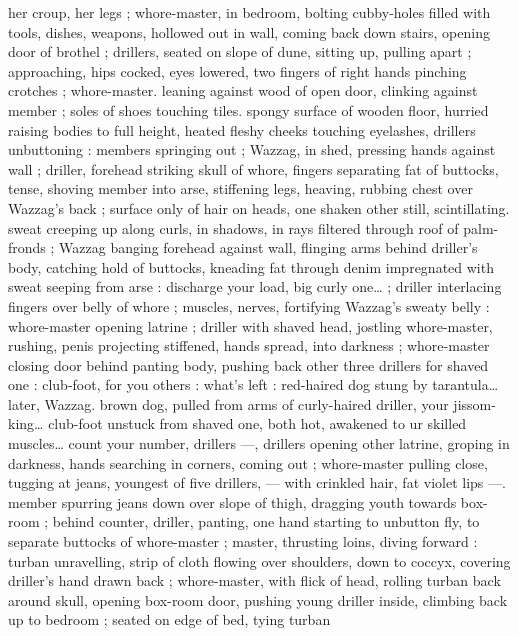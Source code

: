 {her croup, her legs ; whore-master, in bedroom, bolting cubby-holes 
filled with tools, dishes, weapons, hollowed out in wall, coming back 
down stairs, opening door of brothel ; drillers, seated on slope of 
dune, sitting up, pulling apart ; approaching, hips cocked, eyes 
lowered, two fingers of right hands pinching crotches ; whore-master. 
leaning against wood of open door, clinking against member ; soles 
of shoes touching tiles. spongy surface of wooden floor, hurried 
raising bodies to full height, heated fleshy cheeks touching 
eyelashes, drillers unbuttoning : members springing out ; Wazzag, in 
shed, pressing hands against wall ; driller, forehead striking skull of 
whore, fingers separating fat of buttocks, tense, shoving member 
into arse, stiffening legs, heaving, rubbing chest over Wazzag's back 
; surface only of hair on heads, one shaken other still, scintillating. 
sweat creeping up along curls, in shadows, in rays filtered through 
roof of palm-fronds ; Wazzag banging forehead against wall, flinging 
arms behind driller's body, catching hold of buttocks, kneading fat 
through denim impregnated with sweat seeping from arse :{\td} {\gl}{\td} 
discharge your load, big curly one{\ldots}{\gr} ; driller interlacing fingers over 
belly of whore ; muscles, nerves, fortifying Wazzag's sweaty belly : 
whore-master opening latrine ; driller with shaved head, jostling 
whore-master, rushing, penis projecting stiffened, hands spread, into 
darkness ; whore-master closing door behind panting body, pushing 
back other three drillers{\td} {\gl} for shaved one : club-foot, for you others 
: what's left : red-haired dog stung by tarantula{\ldots} later, Wazzag. 
brown dog, pulled from arms of curly-haired driller, your jissom- 
king{\ldots} club-foot unstuck from shaved one, both hot, awakened to 
ur skilled muscles{\ldots} count your number, drillers{\td} {\gr} ---, drillers 
opening other latrine, groping in darkness, hands searching in 
corners, coming out ; whore-master pulling close, tugging at jeans, 
youngest of five drillers, --- with crinkled hair, fat violet lips ---. 
member spurring jeans down over slope of thigh, dragging youth 
towards box-room ; behind counter, driller, panting, one hand 
starting to unbutton fly, to separate buttocks of whore-master ; 
master, thrusting loins, diving forward : turban unravelling, strip of 
cloth flowing over shoulders, down to coccyx, covering driller's hand 
drawn back ; whore-master, with flick of head, rolling turban back 
around skull, opening box-room door, pushing young driller inside, 
climbing back up to bedroom ; seated on edge of bed, tying turban 
}
